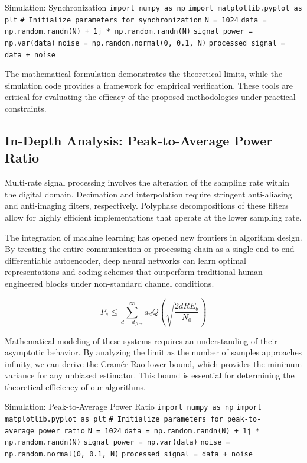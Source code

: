 \begin{pythonbox}{Simulation: Synchronization}
\texttt{import numpy as np}
\texttt{import matplotlib.pyplot as plt}
\texttt{}
\texttt{\# Initialize parameters for synchronization}
\texttt{N = 1024}
\texttt{data = np.random.randn(N) + 1j * np.random.randn(N)}
\texttt{signal\_power = np.var(data)}
\texttt{noise = np.random.normal(0, 0.1, N)}
\texttt{processed\_signal = data + noise}
\end{pythonbox}

\vspace{0.5cm}
The mathematical formulation demonstrates the theoretical limits, while the simulation code provides a framework for empirical verification. These tools are critical for evaluating the efficacy of the proposed methodologies under practical constraints.


\subsection{In-Depth Analysis: Peak-to-Average Power Ratio}
Multi-rate signal processing involves the alteration of the sampling rate within the digital domain. Decimation and interpolation require stringent anti-aliasing and anti-imaging filters, respectively. Polyphase decompositions of these filters allow for highly efficient implementations that operate at the lower sampling rate.

The integration of machine learning has opened new frontiers in algorithm design. By treating the entire communication or processing chain as a single end-to-end differentiable autoencoder, deep neural networks can learn optimal representations and coding schemes that outperform traditional human-engineered blocks under non-standard channel conditions.

\begin{equation}
    P_e \leq \sum_{d=d_{free}}^{\infty} a_d Q\left(\sqrt{\frac{2 d R E_b}{N_0}}\right)
\end{equation}

Mathematical modeling of these systems requires an understanding of their asymptotic behavior. By analyzing the limit as the number of samples approaches infinity, we can derive the Cramér-Rao lower bound, which provides the minimum variance for any unbiased estimator. This bound is essential for determining the theoretical efficiency of our algorithms.

\begin{pythonbox}{Simulation: Peak-to-Average Power Ratio}
\texttt{import numpy as np}
\texttt{import matplotlib.pyplot as plt}
\texttt{}
\texttt{\# Initialize parameters for peak-to-average\_power\_ratio}
\texttt{N = 1024}
\texttt{data = np.random.randn(N) + 1j * np.random.randn(N)}
\texttt{signal\_power = np.var(data)}
\texttt{noise = np.random.normal(0, 0.1, N)}
\texttt{processed\_signal = data + noise}
\end{pythonbox}

